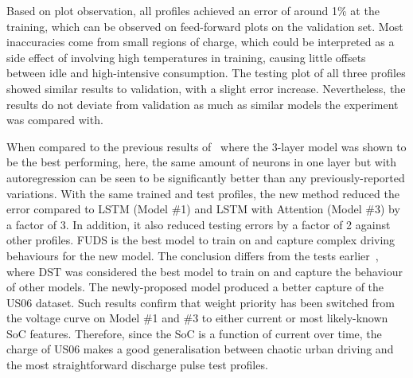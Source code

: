 %
%
Based on plot observation, all profiles achieved an error of around 1\% at the training, which can be observed on feed-forward plots on the validation set.
Most inaccuracies come from small regions of charge, which could be interpreted as a side effect of involving high temperatures in training, causing little offsets between idle and high-intensive consumption.
The testing plot of all three profiles showed similar results to validation, with a slight error increase.
Nevertheless, the results do not deviate from validation as much as similar models the experiment was compared with.

%
%
{%
When compared to the previous results of~\cite{sadykov_practical_2022} where the 3-layer model was shown to be the best performing, here, the same amount of neurons in one layer but with autoregression can be seen to be significantly better than any previously-reported variations.
}
With the same trained and test profiles, the new method reduced the error compared to LSTM (Model \#1) and LSTM with Attention (Model \#3) by a factor of 3.
In addition, it also reduced testing errors by a factor of 2 against other profiles.
FUDS is the best model to train on and capture complex driving behaviours for the new model.
The conclusion differs from the tests earlier~\cite{sadykov_practical_2022}, where DST was considered the best model to train on and capture the behaviour of other models.
The newly-proposed model produced a better capture of the US06 dataset.
Such results confirm that weight priority has been switched from the voltage curve on Model \#1 and \#3 to either current or most likely-known SoC features.
Therefore, since the SoC is a function of current over time, the charge of US06 makes a good generalisation between chaotic urban driving and the most straightforward discharge pulse test profiles.

